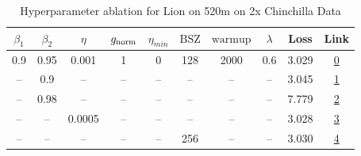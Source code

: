 \begin{table}[H]
\centering
\caption{Hyperparameter ablation for Lion on 520m on 2x Chinchilla Data}
\label{tab:ablation_lion_520m_on_2x_chinchilla_data}
\begin{tabular}{cccccccccc}
\toprule
$\beta_1$ & $\beta_2$ & $\eta$ & $g_{\mathrm{norm}}$ & $\eta_{min}$ & $\mathrm{BSZ}$ & $\mathrm{warmup}$ & $\lambda$ & Loss & Link \\
\midrule
0.9 & 0.95 & 0.001 & 1 & 0 & 128 & 2000 & 0.6 & 3.029 & \href{https://wandb.ai/marin-community/optimizer-scaling/runs/sweep-520m-21B-lion30535dlr0.001-wd0.6-minlr0-warmup2000-b10.9-b-c72b9c}{0} \\
\midrule
-- & 0.9 & -- & -- & -- & -- & -- & -- & 3.045 & \href{https://wandb.ai/marin-community/optimizer-scaling/runs/sweep-520m-21B-lion6d497blr0.001-wd0.6-minlr0-warmup2000-b10.9-b-deb100}{1} \\
-- & 0.98 & -- & -- & -- & -- & -- & -- & 7.779 & \href{https://wandb.ai/marin-community/optimizer-scaling/runs/sweep-520m-21B-lion70e78flr0.001-wd0.6-minlr0-warmup2000-b10.9-b-bd75ef}{2} \\
-- & -- & 0.0005 & -- & -- & -- & -- & -- & 3.028 & \href{https://wandb.ai/marin-community/optimizer-scaling/runs/sweep-520m-21B-lion9e353dlr0.0005-wd0.6-minlr0-warmup2000-b10.9--0e18f5}{3} \\
-- & -- & -- & -- & -- & 256 & -- & -- & 3.030 & \href{https://wandb.ai/marin-community/optimizer-scaling/runs/sweep-520m-21B-lion4bc061lr0.001-wd0.6-minlr0-warmup2000-b10.9-b-979e97}{4} \\
\bottomrule
\end{tabular}
\end{table}

